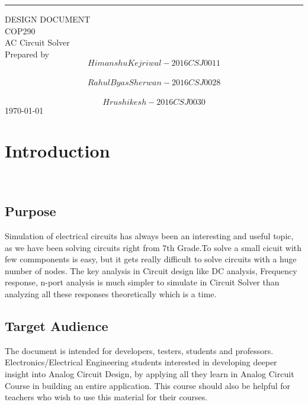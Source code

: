 \documentclass{scrreprt}
\date{}
\begin{document}
\begin{flushright}
    \rule{16cm}{5pt}\vskip1cm
    \begin{bfseries}
        \Huge{DESIGN DOCUMENT}\\
        \vspace{1.9cm}
       COP290\\
        \vspace{1.9cm}
        \LARGE{AC Circuit Solver}\\
        \vspace{1.9cm}
        Prepared by \\ $$Himanshu Kejriwal - 2016CSJ0011$$\\ $$Rahul Byas Sherwan - 2016CSJ0028$$\\ $$Hrushikesh - 2016CSJ0030 $$
        \vspace{1.9cm}
        \today\\
    \end{bfseries}
\end{flushright}

\tableofcontents

\chapter{Introduction}
$ $
\\
\\
$ $

\section{Purpose}
$ $
\\Simulation of electrical circuits has always been an interesting and useful topic, as we have been solving circuits right from 7th Grade.To solve a small cicuit with few commponents is easy, but it gets really difficult to solve circuits with a huge number of nodes. The key analysis in Circuit design like DC analysis, Frequency response, n-port analysis is much simpler to simulate in Circuit Solver than analyzing all these responses theoretically which is a time.\\ $ $

\section{Target Audience}
$ $\\
The document is intended for developers, testers, students and professors. Electronics/Electrical Engineering students interested in developing deeper insight into Analog Circuit Design, by applying all they learn in Analog Circuit Course in building an entire application. This course should also be helpful for teachers who wish to use this material for their courses. \\
$ $
\end{document}
